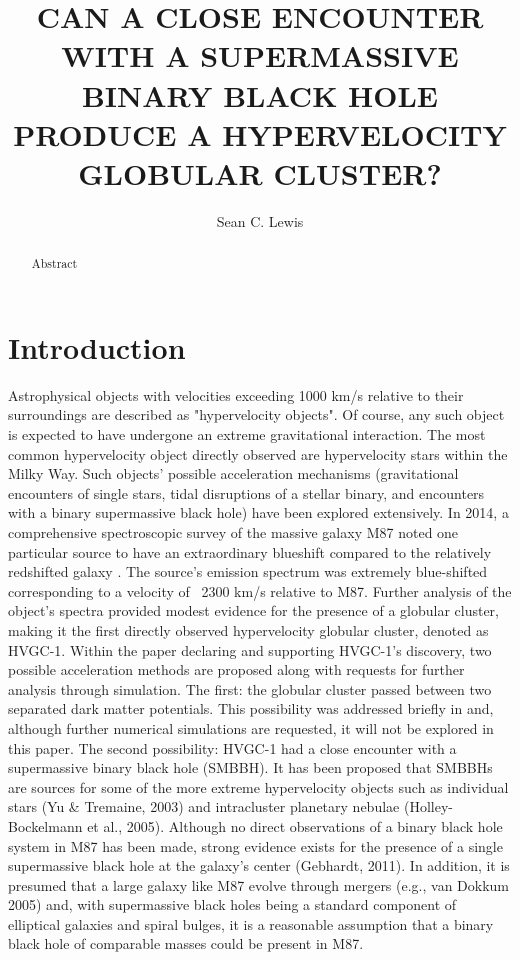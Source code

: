 \documentclass{aastex62}
\begin{document}
\title{CAN A CLOSE ENCOUNTER WITH A SUPERMASSIVE BINARY BLACK HOLE PRODUCE A HYPERVELOCITY GLOBULAR CLUSTER?}

\author{Sean C. Lewis}



\begin{abstract}

Abstract

\end{abstract}
\section{Introduction} \label{sec:intro}
Astrophysical objects with velocities exceeding 1000 km/s relative to their surroundings are described as  "hypervelocity objects". Of course, any such object is expected to have undergone an extreme gravitational interaction. The most common hypervelocity object directly observed are hypervelocity stars within the Milky Way.  Such objects' possible acceleration mechanisms (gravitational encounters of single stars, tidal disruptions of a stellar binary, and encounters with a binary supermassive black hole) have been explored extensively. In 2014, a comprehensive spectroscopic survey of the massive galaxy M87 noted one particular source to have an extraordinary blueshift compared to the relatively redshifted galaxy \citep{cald14}. The source's emission spectrum was extremely blue-shifted corresponding to a velocity of ~2300 km/s relative to M87. Further analysis of the object's spectra provided modest evidence for the presence of a globular cluster, making it the first directly observed hypervelocity globular cluster, denoted as HVGC-1. Within the paper declaring and supporting HVGC-1's discovery, two possible acceleration methods are proposed along with requests for further analysis through simulation. The first: the globular cluster passed between two separated dark matter potentials. This possibility was addressed briefly in \citet{sam15} and, although further numerical simulations are requested, it will not be explored in this paper. The second possibility: HVGC-1 had a close encounter with a supermassive binary black hole  (SMBBH). It has been proposed that SMBBHs are sources for some of the more extreme hypervelocity objects such as individual stars (Yu \& Tremaine, 2003) and intracluster planetary nebulae (Holley-Bockelmann et al., 2005). Although no direct observations of a binary black hole system in M87 has been made, strong evidence exists for the presence of a single supermassive black hole at the galaxy's center (Gebhardt, 2011). In addition, it is presumed that a large galaxy like M87 evolve through mergers (e.g., van Dokkum 2005) and, with supermassive black holes being a standard component of elliptical galaxies and spiral bulges, it is a reasonable assumption that a binary black hole of comparable masses could be present in M87. 
\end{document}
